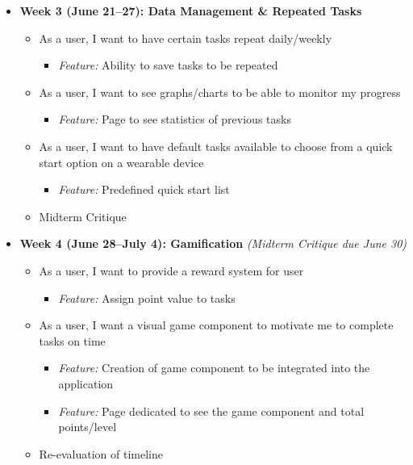 \documentclass[12pt,letterpaper]{article}
\begin{document}
\begin{itemize}
  \item \textbf{Week 3 (June 21--27): Data Management \& Repeated Tasks}
  \begin{itemize}
    \item As a user, I want to have certain tasks repeat daily/weekly
    \begin{itemize}
      \item \textit{Feature:} Ability to save tasks to be repeated
    \end{itemize}
    \item As a user, I want to see graphs/charts to be able to monitor my progress
    \begin{itemize}
      \item \textit{Feature:} Page to see statistics of previous tasks
    \end{itemize}
    \item As a user, I want to have default tasks available to choose from a quick start option on a wearable device
    \begin{itemize}
      \item \textit{Feature:} Predefined quick start list
    \end{itemize}
    \item Midterm Critique
  \end{itemize}
  
  \item \textbf{Week 4 (June 28--July 4): Gamification} \textit {(Midterm Critique due June 30)}
  \begin{itemize}
    \item As a user, I want to provide a reward system for user
    \begin{itemize}
      \item \textit{Feature:} Assign point value to tasks
    \end{itemize}
    \item As a user, I want a visual game component to motivate me to complete tasks on time
    \begin{itemize}
      \item \textit{Feature:} Creation of game component to be integrated into the application
      \item \textit{Feature:} Page dedicated to see the game component and total points/level
    \end{itemize}
    \item Re-evaluation of timeline
  \end{itemize}
  

\end{itemize}
\end{document}
